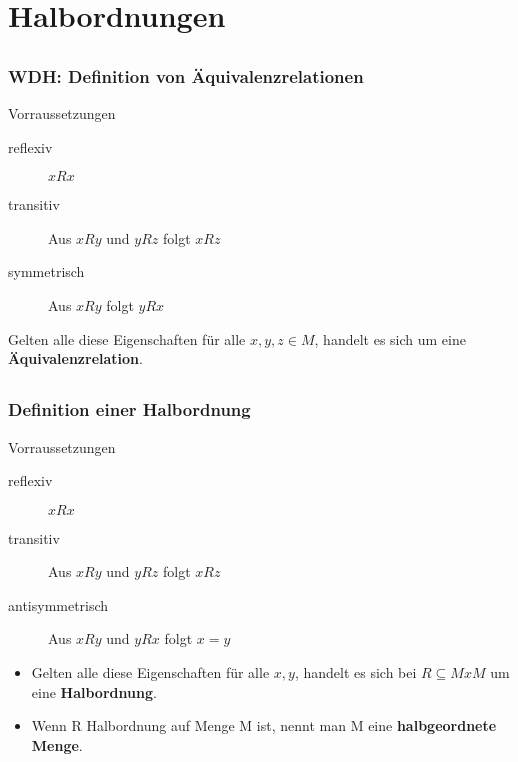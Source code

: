 \section[Halbordnungen]{Halbordnungen}

\subsection*{}
\begin{frame}
  \frametitle{WDH: Definition von Äquivalenzrelationen}

	\begin{block}{Vorraussetzungen} \pause
		\begin{description}
			\item[reflexiv] $x R x$
			\item[transitiv] Aus $x R y$ und $y R z$ folgt $x R z$
			\item[symmetrisch] Aus $x R y$ folgt $y R x$
		\end{description} \pause
		Gelten alle diese Eigenschaften für alle $x,y,z \in M$, handelt es sich um eine \textbf{Äquivalenzrelation}.
	\end{block}
\end{frame}

\subsection*{}
\begin{frame}
  \frametitle{Definition einer Halbordnung}

	\begin{block}{Vorraussetzungen}
		\begin{description}
			\item[reflexiv] $x R x$
			\item[transitiv] Aus $x R y$ und $y R z$ folgt $x R z$ \pause
			\item[antisymmetrisch] Aus $x R y$ und $y R x$ folgt $x = y$
		\end{description} \pause
\begin{itemize}
	\item Gelten alle diese Eigenschaften für alle $x,y$, handelt es sich bei $R \subseteq M x M$ um eine \textbf{Halbordnung}. \pause
	\item	Wenn R Halbordnung auf Menge M ist, nennt man M eine \textbf{halbgeordnete Menge}.
\end{itemize}
	\end{block}
\end{frame}


